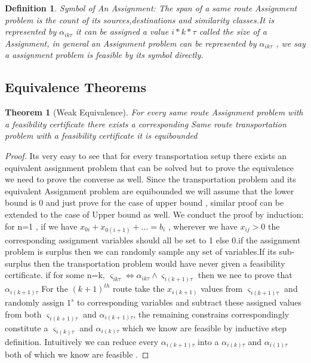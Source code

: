 \documentclass[a4paper]{article}
\newtheorem{definition}{Definition}[section]
\newtheorem{theorem}{Theorem}
\begin{document}
    \begin{definition}{Symbol of An Assignment:}
    The span of a same route Assignment problem is the count of its sources,destinations and similarity classes.It is represented by $\alpha_{ik\tau}$ it can be assigned a value $i*k*\tau$ called the size of a Assignment, in general an Assignment problem can be represented by $\alpha_{ik\tau}$ , we say a assignment problem is feasible by its symbol directly.
    \end{definition}
    
    \subsection{Equivalence Theorems}
    \begin{theorem}[Weak Equivalence] \label{thm:we}
    For every same route Assignment problem with a feasibility certificate there exists a corresponding Same route transportation problem with a feasibility certificate it is equibounded
    \end{theorem}
    \begin{proof}
    Its very easy to see that for every transportation setup there exists an equivalent assignment problem that can be solved but to prove the equivalence we need to prove the converse as well.
    \newline
    Since the transportation problem and its equivalent Assignment problem are equibounded we will assume that the lower bound is 0 and just prove for the case of upper bound , similar proof can be extended to the case of Upper bound as well.
    \newline
    We conduct the proof by induction:
    \newline for n=1 , if we have $x_{0i}+x_{0(i+1)}+... =b_i$ , wherever we have $x_{ij}>0$ the corresponding assignment variables should all be set to 1 else 0.if the assignment problem is surplus then we can randomly sample any set of variables.If its sub-surplus then the transportation problem would have never given a feasibility certificate.
    \newline if for some n=k, $\varsigma_{ik\tau} \iff \alpha_{ik\tau} \wedge \varsigma_{i(k+1)\tau} $ then we nee to prove that $\alpha_{i(k+1)\tau}$
    \newline
    For the $(k+1)^{th}$ route take the $x_{i(k+1)}$ values from $\varsigma_{i(k+1)\tau}$ and randomly assign $1^s$ to corresponding variables and subtract these assigned values from both $\varsigma_{i(k+1)\tau}$ and $\alpha_{i(k+1)\tau}$, the remaining constrains correspondingly constitute a $\varsigma_{i(k)\tau}$ and $\alpha_{i(k)\tau}$ which we know are feasible by inductive step definition.
    \newline Intuitively we can reduce every  $\alpha_{i(k+1)\tau}$ into a
    $\alpha_{i(k)\tau}$ and $\alpha_{i(1)\tau}$ both of which we know are feasible . 
    \end{proof}
    
\end{document}
